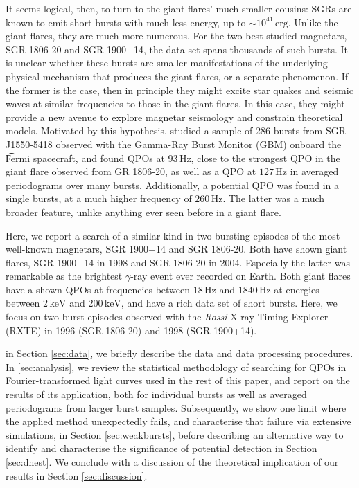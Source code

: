 \documentclass[numberedappendix]{emulateapj}
\newcommand{\hz}{\,\mathrm{Hz}}
\begin{document}
It seems logical, then, to turn to the giant flares' much smaller cousins: SGRs are known to emit short bursts with much less energy, up to $\sim 10^{41} \, \mathrm{erg}$. Unlike the giant flares, they are much more numerous. For the two best-studied magnetars, SGR 1806-20 and SGR 1900+14, the data set spans thousands of such bursts. It is unclear whether these bursts are smaller manifestations of the underlying physical mechanism that produces the giant flares, or a separate phenomenon. If the former is the case, then in principle they might excite star quakes and seismic waves at similar frequencies to those in the giant flares. In this case, they might provide a new avenue to explore magnetar seismology and constrain theoretical models. Motivated by this hypothesis, \citet{huppenkothen2014} studied a sample of 286 bursts from SGR J1550-5418 observed with the Gamma-Ray Burst Monitor (GBM) onboard the {\t Fermi} spacecraft, and found QPOs at $93 \hz$, close to the strongest QPO in the giant flare observed from GR 1806-20, as well as a QPO at $127\hz$ in averaged periodograms over many bursts. Additionally, a potential QPO was found in a single bursts, at a much higher frequency of $260 \hz$. The latter was a much broader feature, unlike anything ever seen before in a giant flare.

Here, we report a search of a similar kind in two bursting episodes of the most well-known magnetars, SGR 1900+14 and SGR 1806-20. Both have shown giant flares, SGR 1900+14 in 1998 and SGR 1806-20 in 2004. Especially the latter was remarkable as the brightest $\gamma$-ray event ever recorded on Earth. Both giant flares have a shown QPOs at frequencies between $18\hz$ and $1840\hz$ at energies between $2 \, \mathrm{keV}$ and $200 \, \mathrm{keV}$, and have a rich data set of short bursts.
Here, we focus on two burst episodes observed with the {\it Rossi} X-ray Timing Explorer (RXTE) in 1996 (SGR 1806-20) and 1998 (SGR 1900+14). 

in Section \ref{sec:data}, we briefly describe the data and data processing procedures. In \ref{sec:analysis}, we review the statistical methodology of searching for QPOs in Fourier-transformed light curves used in the rest of this paper, and report on the results of its application, both for individual bursts as well as averaged periodograms from larger burst samples. Subsequently, we show one limit where the applied method unexpectedly fails, and characterise that failure via extensive simulations, in Section \ref{sec:weakbursts}, before describing an alternative way to identify and characterise the significance of potential detection in Section \ref{sec:dnest}. We conclude with a discussion of the theoretical implication of our results in Section \ref{sec:discussion}.
\end{document}
